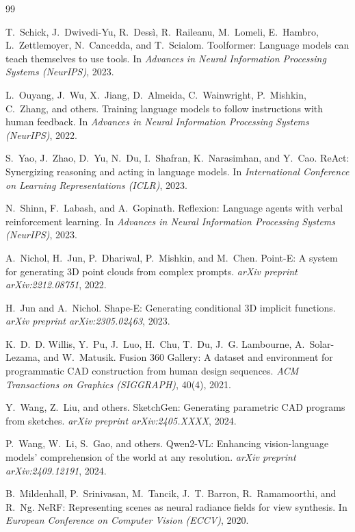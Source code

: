 {\small
\begin{thebibliography}{99}

T.~Schick, J.~Dwivedi-Yu, R.~Dess{\`i}, R.~Raileanu, M.~Lomeli,
E.~Hambro, L.~Zettlemoyer, N.~Cancedda, and T.~Scialom.
Toolformer: Language models can teach themselves to use tools.
In \emph{Advances in Neural Information Processing Systems (NeurIPS)}, 2023.

L.~Ouyang, J.~Wu, X.~Jiang, D.~Almeida, C.~Wainwright,
P.~Mishkin, C.~Zhang, and others.
Training language models to follow instructions with human feedback.
In \emph{Advances in Neural Information Processing Systems (NeurIPS)}, 2022.

S.~Yao, J.~Zhao, D.~Yu, N.~Du, I.~Shafran,
K.~Narasimhan, and Y.~Cao.
ReAct: Synergizing reasoning and acting in language models.
In \emph{International Conference on Learning Representations (ICLR)}, 2023.

N.~Shinn, F.~Labash, and A.~Gopinath.
Reflexion: Language agents with verbal reinforcement learning.
In \emph{Advances in Neural Information Processing Systems (NeurIPS)}, 2023.

A.~Nichol, H.~Jun, P.~Dhariwal, P.~Mishkin, and M.~Chen.
Point-E: A system for generating 3D point clouds from complex prompts.
\emph{arXiv preprint arXiv:2212.08751}, 2022.

H.~Jun and A.~Nichol.
Shape-E: Generating conditional 3D implicit functions.
\emph{arXiv preprint arXiv:2305.02463}, 2023.

K.~D.~D. Willis, Y.~Pu, J.~Luo, H.~Chu,
T.~Du, J.~G. Lambourne, A.~Solar-Lezama, and W.~Matusik.
Fusion 360 Gallery: A dataset and environment for programmatic CAD
construction from human design sequences.
\emph{ACM Transactions on Graphics (SIGGRAPH)}, 40(4), 2021.

Y.~Wang, Z.~Liu, and others.
SketchGen: Generating parametric CAD programs from sketches.
\emph{arXiv preprint arXiv:2405.XXXX}, 2024.

P.~Wang, W.~Li, S.~Gao, and others.
Qwen2-VL: Enhancing vision-language models' comprehension of the world
at any resolution.
\emph{arXiv preprint arXiv:2409.12191}, 2024.

B.~Mildenhall, P.~Srinivasan, M.~Tancik,
J.~T. Barron, R.~Ramamoorthi, and R.~Ng.
NeRF: Representing scenes as neural radiance fields for view synthesis.
In \emph{European Conference on Computer Vision (ECCV)}, 2020.


\end{thebibliography}}
